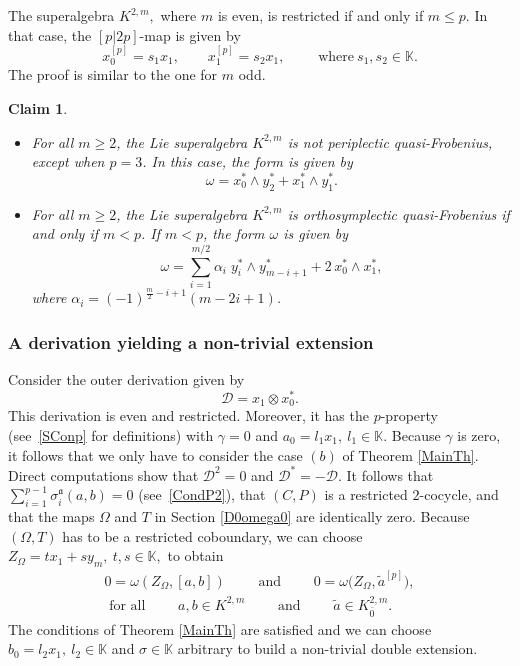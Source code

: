 \documentclass[pdftex]{sigma}
\numberwithin{equation}{section}
\newtheorem{Claim}[Theorem]{Claim}
\begin{document}
The superalgebra $K^{2,m},$ where $m$ is even, is restricted if and only if $m\leq p$. In that case, the $[p|2p]$-map is given by
\[
x_0^{[p]}=s_1 x_1, \qquad x_1^{[p]}=s_2 x_1,\qquad \text{ where}\ s_1, s_2\in \mathbb K.
\] The proof is similar to the one for $m$ odd.

\begin{Claim}\quad
 \begin{itemize}\itemsep=0pt\item[$(i)$] For all $m\geq 2$, the Lie superalgebra $K^{2,m}$ is not periplectic quasi-Frobenius, except when ${p=3}$. In this case, the form is given by
\[\omega=x_{0}^* \wedge y_{2}^*+x_{1}^* \wedge y_{1}^*.\]
\item[$(ii)$]For all $m\geq 2$, the Lie superalgebra $K^{2,m}$ is orthosymplectic quasi-Frobenius if and only if $m<p$. If $m<p$, the form $\omega$ is given by
\[
\omega= \sum_{i=1}^{m/2} \alpha_i \; y_{i}^* \wedge y_{m-i+1}^* +2\, x_0^*\wedge x_1^*,
\]
where $\alpha_{i}= (-1)^{\frac{m}{2}-i+1} (m-2i+1)$.
\end{itemize}
\end{Claim}
\subsubsection{A derivation yielding a non-trivial extension} Consider the outer derivation given by
\[
{\mathscr D}=x_1\otimes x_0^*.
\]
This derivation is even and restricted. Moreover, it has the $p$-property (see~\eqref{SConp} for definitions) with $\gamma=0$ and $a_0=l_1x_1,~l_1\in\mathbb K$. Because $\gamma$ is zero, it follows that we only have to consider the case $(b)$ of Theorem \ref{MainTh}. Direct computations show that ${\mathscr D}^2=0$ and ${\mathscr D}^*=-{\mathscr D}$. It follows that $\sum_{i=1}^{p-1}\sigma_i^{\mathfrak{a}}(a,b)=0$ (see~\eqref{CondP2}), that $(C,P)$ is a restricted $2$-cocycle, and that the maps $\Omega$ and $T$ in Section \ref{D0omega0} are identically zero. Because $(\Omega,T)$ has to be a restricted coboundary, we can choose $Z_{\Omega}=tx_1+sy_m,~t,s\in\mathbb K,$ to obtain
\begin{gather*}
0=\omega(Z_{\Omega},[a,b])\qquad \text{ and }\qquad 0=\omega\bigl(Z_{\Omega},\tilde{a}^{[p]}\bigr),\\
\text{ for all }\qquad a,b\in K^{2,m}\qquad \text{ and }\qquad \tilde{a} \in K^{2,m}_{\bar{0}}.
\end{gather*}
 The conditions of Theorem \ref{MainTh} are satisfied and we can choose $b_0=l_2x_1,~l_2\in \mathbb K$ and $\sigma\in \mathbb K$ arbitrary to build a non-trivial double extension.
\end{document}
